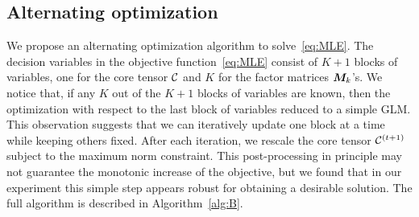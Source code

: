 \documentclass[12pt]{article}
\theoremstyle{plain}
\theoremstyle{definition}
\begin{document}
\subsection{Alternating optimization} \label{subsec:alg}
We propose an alternating optimization algorithm to solve~\eqref{eq:MLE}. 
The decision variables in the objective function~\eqref{eq:MLE} consist of $K+1$ blocks of variables, one for the core tensor $\mathcal{C}$ and $K$ for the factor matrices $\bm M_k$'s. We notice that, if any $K$ out of the $K+1$ blocks of variables are known, then the optimization with respect to the last block of variables reduced to a simple GLM. This observation suggests that we can iteratively update one block at a time while keeping others fixed. After each iteration, we rescale the core tensor $\mathcal{C}^{(t+1)}$ subject to the maximum norm constraint. This post-processing in principle may not guarantee the monotonic increase of the objective, but we found that in our experiment this simple step appears robust for obtaining a desirable solution. The full algorithm is described in Algorithm~\ref{alg:B}.
\end{document}
